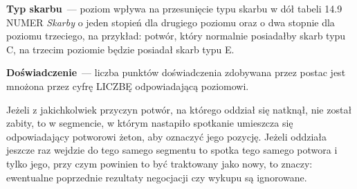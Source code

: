 \textbf{Typ skarbu}~--- poziom wpływa na przesunięcie typu skarbu w dół tabeli 14.9 NUMER \textit{Skarby} o jeden stopień dla drugiego poziomu oraz o dwa stopnie dla poziomu trzeciego, na przykład: potwór, który normalnie posiadałby skarb typu C, na trzecim poziomie będzie posiadał skarb typu E.

\textbf{Doświadczenie}~--- liczba punktów doświadczenia zdobywana przez postac jest mnożona przez cyfrę LICZBĘ odpowiadającą poziomowi.

Jeżeli z jakichkolwiek przyczyn potwór, na którego oddział się natknął, nie został zabity, to w segmencie, w którym nastapiło spotkanie umieszcza się odpowiadający potworowi żeton, aby oznaczyć jego pozycję.
Jeżeli oddziała jeszcze raz wejdzie do tego samego segmentu to spotka tego samego potwora i tylko jego, przy czym powinien to być traktowany jako nowy, to znaczy: ewentualne poprzednie rezultaty negocjacji czy wykupu są ignorowane.
